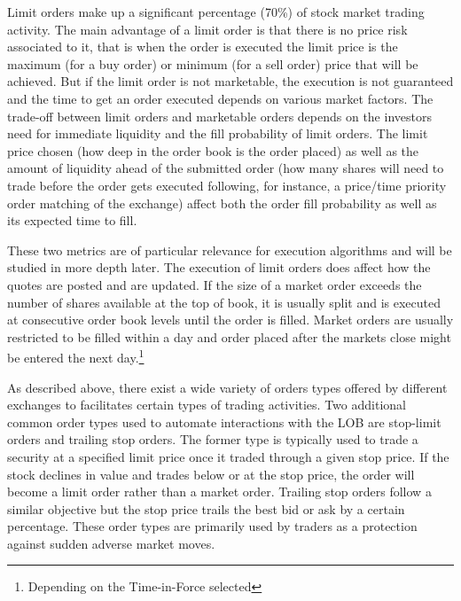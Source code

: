 Limit orders make up a significant percentage (70\%) of stock market trading activity. The main advantage of a limit order is that there is no price risk associated to it, that is when the order is executed the limit price is the maximum (for a buy order) or minimum (for a sell order) price that will be achieved. But if the limit order is not marketable, the execution is not guaranteed and the time to get an order executed depends on various market factors. The trade-off between limit orders and marketable orders depends on the investors need for immediate liquidity and the fill probability of limit orders. The limit price chosen (how deep in the order book is the order placed) as well as the amount of liquidity ahead of the submitted order (how many shares will need to trade before the order gets executed following, for instance, a price/time priority order matching of the exchange) affect both the order fill probability as well as its expected time to fill. 


These two metrics are of particular relevance for execution algorithms and will be studied in more depth later. The execution of limit orders does affect how the quotes are posted and are updated. If the size of a market order exceeds the number of shares available at the top of book, it is usually split and is executed at consecutive order book levels until the order is filled. Market orders are usually restricted to be filled within a day and order placed after the markets close might be entered the next day.\footnote{Depending on the Time-in-Force selected}


As described above, there exist a wide variety of orders types offered by different exchanges to facilitates certain types of trading activities. Two additional common order types used to automate interactions with the LOB are stop-limit orders and trailing stop orders. The former type is typically used to trade a security at a specified limit price once it traded through a given stop price. If the stock declines in value and trades below or at the stop price, the order will become a limit order rather than a market order. Trailing stop orders follow a similar objective but the stop price trails the best bid or ask by a certain percentage. These order types are primarily used by traders as a protection against sudden adverse market moves. \\


